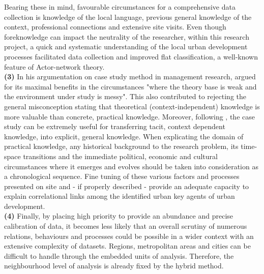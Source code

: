 \documentclass[11pt]{report}
\begin{document}
Bearing these in mind, favourable circumstances for a comprehensive data collection is knowledge of the local language, previous general knowledge of the context, professional connections and extensive site visits. Even though foreknowledge can impact the neutrality of the researcher, within this research project, a quick and systematic understanding of the local urban development processes facilitated data collection and improved flat classification, a well-known feature of Actor-network theory. 
\\

\textbf{(3)} In his argumentation on case study method in management research, \href{Harrison}{\citealt{partington_case_2002}} argued for its maximal benefits in the circumstances "where the theory base is weak and the environment under study is messy".
This also contributed to rejecting the general misconception stating that theoretical (context-independent) knowledge is more valuable than concrete, practical knowledge. Moreover, following \href{Flyvbjerg}{\citealt{flyvbjerg_five_2006}}, the case study can be extremely useful for transferring tacit, context dependent knowledge, into explicit, general knowledge. When explicating the domain of practical knowledge, any historical background to the research problem, its time-space transitions and the immediate political, economic and cultural circumstances where it emerges and evolves should be taken into consideration as a chronological sequence. Fine tuning of these various factors and processes presented on site and - if properly described - provide an adequate capacity to explain correlational links among the identified urban key agents of urban development.
\\

\textbf{(4) }Finally, by placing high priority to provide an abundance and precise calibration of data, it becomes less likely that an overall scrutiny of numerous relations, behaviours and processes could be possible in a wider context with an extensive complexity of datasets. Regions, metropolitan areas and cities can be difficult to handle through the embedded units of analysis. Therefore, the neighbourhood level of analysis is already fixed by the hybrid method.
\\
\end{document}
